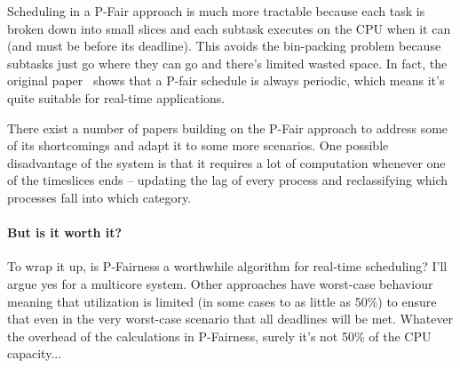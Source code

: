 Scheduling in a P-Fair approach is much more tractable because each task is broken down into small slices and each subtask executes on the CPU when it can (and must be before its deadline). This avoids the bin-packing problem because subtasks just go where they can go and there's limited wasted space. In fact, the original paper~\cite{pfair} shows that a P-fair schedule is always periodic, which means it's quite suitable for real-time applications.

There exist a number of papers building on the P-Fair approach to address some of its shortcomings and adapt it to some more scenarios. One possible disadvantage of the system is that it requires a lot of computation whenever one of the timeslices ends -- updating the lag of every process and reclassifying which processes fall into which category. 

\paragraph{But is it worth it?}
To wrap it up, is P-Fairness a worthwhile algorithm for real-time scheduling? I'll argue yes for a multicore system. Other approaches have worst-case behaviour meaning that utilization is limited (in some cases to as little as 50\%) to ensure that even in the very worst-case scenario that all deadlines will be met. Whatever the overhead of the calculations in P-Fairness, surely it's not 50\% of the CPU capacity...



